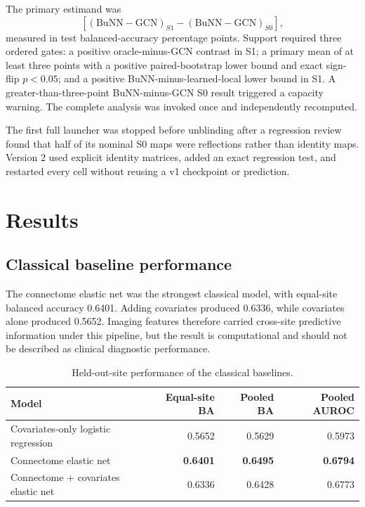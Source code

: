 \documentclass[11pt,a4paper]{article}
\begin{document}
The primary estimand was
\[
[(\mathrm{BuNN}-\mathrm{GCN})_{S1}-(\mathrm{BuNN}-\mathrm{GCN})_{S0}],
\]
measured in test balanced-accuracy percentage points. Support required three
ordered gates: a positive oracle-minus-GCN contrast in S1; a primary mean of
at least three points with a positive paired-bootstrap lower bound and exact
sign-flip $p<0.05$; and a positive BuNN-minus-learned-local lower bound in S1.
A greater-than-three-point BuNN-minus-GCN S0 result triggered a capacity
warning. The complete analysis was invoked once and independently recomputed.

The first full launcher was stopped before unblinding after a regression review
found that half of its nominal S0 maps were reflections rather than identity
maps. Version 2 used explicit identity matrices, added an exact regression
test, and restarted every cell without reusing a v1 checkpoint or prediction.

\section{Results}

\subsection{Classical baseline performance}

The connectome elastic net was the strongest classical model, with equal-site
balanced accuracy 0.6401. Adding covariates produced 0.6336, while covariates
alone produced 0.5652. Imaging features therefore carried cross-site
predictive information under this pipeline, but the result is computational
and should not be described as clinical diagnostic performance.

\begin{table}[htbp]
\centering
\caption{Held-out-site performance of the classical baselines.}
\label{tab:baselines}
\begin{tabularx}{\textwidth}{@{}Y r r r@{}}
\toprule
\textbf{Model} & \textbf{Equal-site BA} & \textbf{Pooled BA} & \textbf{Pooled AUROC} \\
\midrule
Covariates-only logistic regression & 0.5652 & 0.5629 & 0.5973 \\
Connectome elastic net & \textbf{0.6401} & \textbf{0.6495} & \textbf{0.6794} \\
Connectome + covariates elastic net & 0.6336 & 0.6428 & 0.6773 \\
\bottomrule
\end{tabularx}
\end{table}
\end{document}
